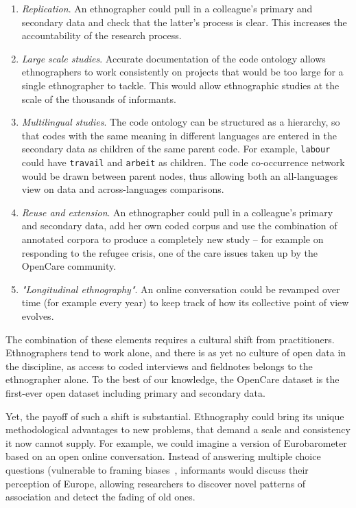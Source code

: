 \documentclass{llncs}
\begin{document}
\begin{enumerate}
\item \emph{Replication}. An ethnographer could pull in a colleague's primary and secondary data and check that the latter's process is clear. This increases the accountability of the research process.
\item \emph{Large scale studies}. Accurate documentation of the code ontology allows ethnographers to work consistently on projects that would be too large for a single ethnographer to tackle. This would allow ethnographic studies at the scale of the thousands of informants. 
\item \emph{Multilingual studies}. The code ontology can be structured as a hierarchy, so that codes with the same meaning in different languages are entered in the secondary data as children of the same parent code. For example, \texttt{labour} could have \texttt{travail} and \texttt{arbeit} as children. The code co-occurrence network would be drawn between parent nodes, thus allowing both an all-languages view on data and across-languages comparisons. 
\item \emph{Reuse and extension}. An ethnographer could pull in a colleague's primary and secondary data, add her own coded corpus and use the combination of annotated corpora to produce a completely new study – for example on responding to the refugee crisis, one of the care issues taken up by the OpenCare community. 
\item \emph{"Longitudinal ethnography"}. An online conversation could be revamped over time (for example every year) to keep track of how its collective point of view evolves. 
\end{enumerate}

The combination of these elements requires a cultural shift from practitioners. Ethnographers tend to work alone, and there is as yet no culture of open data in the discipline, as access to coded interviews and fieldnotes belongs to the ethnographer alone. To the best of our knowledge, the OpenCare dataset is the first-ever open dataset including primary and secondary data. 

Yet, the payoff of such a shift is substantial. Ethnography could bring its unique methodological advantages to new  problems, that demand a scale and consistency it now cannot supply. For example, we could imagine a version of Eurobarometer based on an open online conversation. Instead of answering multiple choice questions (vulnerable to framing biases~\cite{tversky1985framing}, informants would discuss their perception of Europe, allowing researchers to discover novel patterns of association and detect the fading of old ones.
\end{document}
